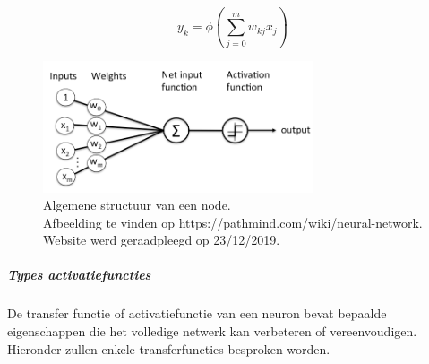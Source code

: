 			\begin{equation}
				y_k = \phi \left( \sum_{j=0}^{m}w_{kj}x_j\right) 
			\end{equation}
			
			\begin{figure}
				\centering
				\includegraphics[width=80mm]{afbeeldingen/Artificial_neuron2.PNG}
				\caption{Algemene structuur van een node.\\Afbeelding te vinden op https://pathmind.com/wiki/neural-network.\\ Website werd geraadpleegd op 23/12/2019. }
				\label{fig:artificial_neuron}
			\end{figure}
			
			\subparagraph{Types activatiefuncties}
			De transfer functie of activatiefunctie van een neuron bevat bepaalde eigenschappen die het volledige netwerk kan verbeteren of vereenvoudigen. Hieronder zullen enkele transferfuncties besproken worden.
			

